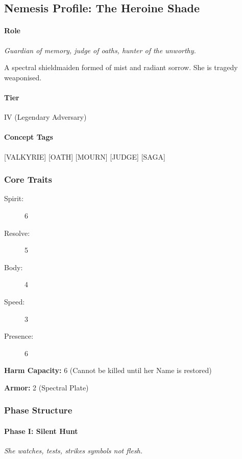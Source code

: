 \documentclass[11pt]{article}
\begin{document}

\subsection{Nemesis Profile: The Heroine Shade}
\label{nemesis:mist_heroine}

\paragraph*{Role}
\textit{Guardian of memory, judge of oaths, hunter of the unworthy.}

A spectral shieldmaiden formed of mist and radiant sorrow.  
She is tragedy weaponised.

\paragraph*{Tier}
IV (Legendary Adversary)

\paragraph*{Concept Tags}
[VALKYRIE] [OATH] [MOURN] [JUDGE] [SAGA]

\subsubsection*{Core Traits}
\begin{description}
    \item[Spirit:] 6
    \item[Resolve:] 5
    \item[Body:] 4
    \item[Speed:] 3
    \item[Presence:] 6
\end{description}

\noindent
\textbf{Harm Capacity:} 6 (Cannot be killed until her Name is restored)

\textbf{Armor:} 2 (Spectral Plate)

\subsubsection*{Phase Structure}

\paragraph*{Phase I: Silent Hunt}
\textit{She watches, tests, strikes symbols not flesh.}
\end{document}
